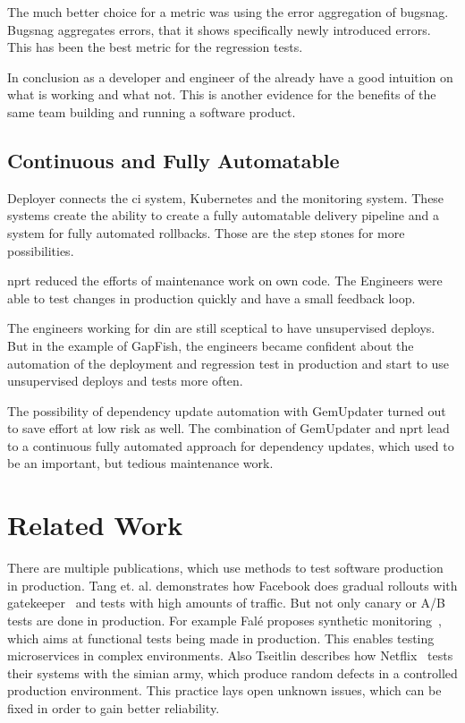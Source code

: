 The much better choice for a metric was using the error aggregation of bugsnag. Bugsnag
aggregates errors, that it shows specifically newly introduced errors. This has been the
best metric for the regression tests.


In conclusion as a developer and engineer of the already have a good intuition on what is
working and what not. This is another evidence for the benefits of the same team building
and running a software product.

\subsection{Continuous and Fully Automatable}

Deployer connects the \gls{ci} system, Kubernetes and the monitoring system. These systems
create the ability to create a fully automatable delivery pipeline and a system for fully
automated rollbacks. Those are the step stones for more possibilities.

\gls{nprt} reduced the efforts of maintenance work on own code. The Engineers were able to
test changes in production quickly and have a small feedback loop.

The engineers working for \gls{din} are still sceptical to have unsupervised deploys. But in the
example of GapFish, the engineers became confident about the automation of the deployment
and regression test in production and start to use unsupervised deploys and tests more often.

The possibility of dependency update automation with GemUpdater turned out to save effort
at low risk as well. The combination of GemUpdater and \gls{nprt} lead to a continuous
fully automated approach for dependency updates, which used to be an important, but
tedious maintenance work.

\section{Related Work}

There are multiple publications, which use methods to test software production in
production. Tang et. al. demonstrates how Facebook does gradual rollouts with
gatekeeper~\cite{fb_config_management} and tests with high amounts of traffic. But not
only canary or A/B tests are done in production. For example Falé proposes synthetic
monitoring~\cite{synthmonitoring}, which aims at functional tests being made in
production. This enables testing microservices in complex environments. Also Tseitlin
describes how Netflix~\cite{antifragile_org} tests their systems with the simian army,
which produce random defects in a controlled production environment. This practice lays
open unknown issues, which can be fixed in order to gain better reliability.

